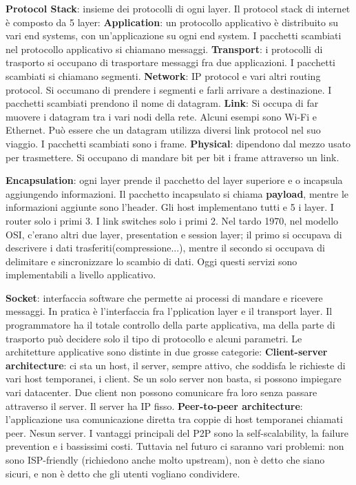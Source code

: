 \documentclass[a4paper,10pt]{article} %
\renewcommand{\b}[1]{%
    {\textbf{#1}}}
\begin{document}
\b{Protocol Stack}: insieme dei protocolli di ogni layer. Il protocol stack di internet è composto da 5 layer: \b{Application}: un protocollo applicativo è distribuito su vari end systems, con un'applicazione su ogni end system. I pacchetti scambiati nel protocollo applicativo si chiamano messaggi. \b{Transport}: i protocolli di trasporto si occupano di trasportare messaggi fra due applicazioni. I pacchetti scambiati si chiamano segmenti. \b{Network}: IP protocol  e vari altri routing protocol. Si occumano di prendere i segmenti e farli arrivare a destinazione. I pacchetti scambiati prendono il nome di datagram. \b{Link}: Si occupa di far muovere i datagram tra i vari nodi della rete. Alcuni esempi sono Wi-Fi e Ethernet. Può essere che un datagram utilizza diversi link protocol nel suo viaggio. I pacchetti scambiati sono i frame. \b{Physical}: dipendono dal mezzo usato per trasmettere. Si occupano di mandare bit per bit i frame attraverso un link. 

\b{Encapsulation}: ogni layer prende il pacchetto del layer superiore e o incapsula aggiungendo informazioni. Il pacchetto incapsulato si chiama \b{payload}, mentre le informazioni aggiunte sono l'header. Gli host implementano tutti e 5 i layer. I router solo i primi 3. I link switches solo i primi 2. 
Nel tardo 1970, nel modello OSI, c'erano altri due layer, presentation e session layer; il primo si occupava di descrivere i dati trasferiti(compressione...), mentre il secondo si occupava di delimitare e sincronizzare lo scambio di dati. Oggi questi servizi sono implementabili a livello applicativo.

\b{Socket}: interfaccia software che permette ai processi di mandare e ricevere messaggi. In pratica è l'interfaccia fra l'pplication layer e il transport layer. Il programmatore ha il totale controllo della parte applicativa, ma della parte di trasporto può decidere solo il tipo di protocollo e alcuni parametri.
Le architetture applicative sono distinte in due grosse categorie: \b{Client-server architecture}: ci sta un host, il server, sempre attivo, che soddisfa le richieste di vari host temporanei, i client. Se un solo server non basta, si possono impiegare vari datacenter. Due client non possono comunicare fra loro senza passare attraverso il server. Il server ha IP fisso. \b{Peer-to-peer architecture}: l'applicazione usa comunicazione diretta tra coppie di host temporanei chiamati peer. Nesun server. I vantaggi principali del P2P sono la self-scalability, la failure prevention e i bassissimi costi. Tuttavia nel futuro ci saranno vari problemi: non sono ISP-friendly (richiedono anche molto upstream), non è detto che siano sicuri, e non è detto che gli utenti vogliano condividere.
\end{document}
